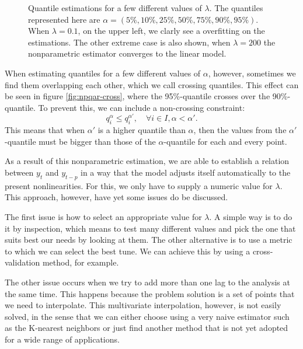 \begin{figure}[htp]
\begin{minipage}[t]{0.4\linewidth}
\begin{minipage}[b]{\linewidth}
      \label{fig:npqar-cross}
     \end{minipage}
  \end{minipage}
  \caption{Quantile estimations for a few different values of $\lambda$. The quantiles represented here are $\alpha = (5\%, 10\%, 25\%, 50\%, 75\%, 90\%, 95\%)$. When $\lambda = 0.1$, on the upper left, we clarly see a overfitting on the estimations. The other extreme case is also shown, when $\lambda=200$ the nonparametric estimator converges to the linear model.}
  \label{fig:npqar-results}
\end{figure}


When estimating quantiles for a few different values of $\alpha$, however, sometimes we find them overlapping each other, which we call crossing quantiles. This effect can be seen in figure \ref{fig:npqar-cross}, where the 95\%-quantile crosses over the 90\%-quantile. To prevent this, we can include a non-crossing constraint:
\begin{equation}
q_i^{\alpha} \leq q_i^{\alpha'}, \quad \forall i \in I, \alpha < \alpha'.
\end{equation}
This means that when $\alpha'$ is a higher quantile than $\alpha$, then the values from the $\alpha'$-quantile must be bigger than those of the $\alpha$-quantile for each and every point.

As a result of this nonparametric estimation, we are able to establish a relation between $y_t$ and $y_{t-p}$ in a way that the model adjusts itself automatically to the present nonlinearities. For this, we only have to supply a numeric value for $\lambda$. This approach, however, have yet some issues do be discussed. 

The first issue is how to select an appropriate value for $\lambda$. A simple way is to do it by inspection, which means to test many different values and pick the one that suits best our needs by looking at them. The other alternative is to use a metric to which we can select the best tune. We can achieve this by using a cross-validation method, for example.

The other issue occurs when we try to add more than one lag to the analysis at the same time. This happens because the problem solution is a set of points that we need to interpolate. This multivariate interpolation, however, is not easily solved, in the sense that we can either choose using a very naive estimator such as the K-nearest neighbors or just find another method that is not yet adopted for a wide range of applications.

